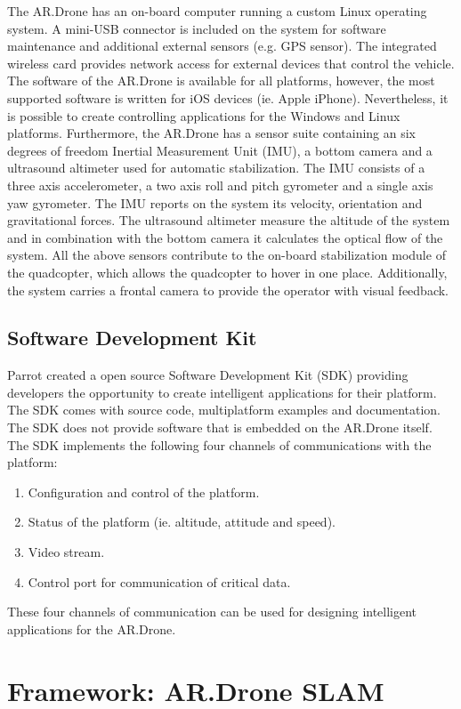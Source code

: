 \documentclass[a4paper]{article}
\begin{document}
The AR.Drone has an on-board computer running a custom Linux operating system. A mini-USB connector is included on the system for software maintenance and additional external sensors (e.g. GPS sensor). The integrated wireless card provides network access for external devices that control the vehicle. The software of the AR.Drone is available for all platforms, however, the most supported software is written for iOS devices (ie. Apple iPhone). Nevertheless, it is possible to create controlling applications for the Windows and Linux platforms. Furthermore, the AR.Drone has a sensor suite containing an six degrees of freedom Inertial Measurement Unit (IMU), a bottom camera and a ultrasound altimeter used for automatic stabilization. The IMU consists of a three axis accelerometer, a two axis roll and pitch gyrometer and a single axis yaw gyrometer. The IMU reports on the system its velocity, orientation and gravitational forces. The ultrasound altimeter measure the altitude of the system and in combination with the bottom camera it calculates the optical flow of the system. All the above sensors contribute to the on-board stabilization module of the quadcopter, which allows the quadcopter to hover in one place. Additionally, the system carries a frontal camera to provide the operator with visual feedback.

\subsection{Software Development Kit}
Parrot created a open source Software Development Kit (SDK) providing developers the opportunity to create intelligent applications for their platform. The SDK comes with source code, multiplatform examples and documentation. The SDK does not provide software that is embedded on the AR.Drone itself. The SDK implements the following four channels of communications with the platform:
\begin{enumerate}
\item Configuration and control of the platform.
\item Status of the platform (ie. altitude, attitude and speed).
\item Video stream.
\item Control port for communication of critical data.
\end{enumerate}
These four channels of communication can be used for designing intelligent applications for the AR.Drone.

\section{Framework: AR.Drone SLAM}
\label{framework}
\end{document}
